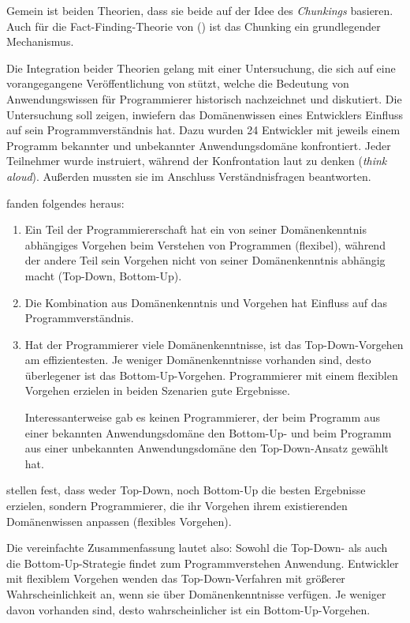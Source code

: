\begin{important}
Gemein ist beiden Theorien, dass sie beide auf der Idee des \textit{Chunkings} \citep{Miller:1956dz} basieren. Auch für die Fact-Finding-Theorie von \cite{LaToza:2007fj} () ist das Chunking ein grundlegender Mechanismus.

Die Integration beider Theorien gelang \cite{Shaft:1998tc} mit einer Untersuchung, die sich auf eine vorangegangene Veröffentlichung von \cite{Glass:1992cw} stützt, welche die Bedeutung von Anwendungswissen für Programmierer historisch nachzeichnet und diskutiert. Die Untersuchung soll zeigen, inwiefern das Domänenwissen eines Entwicklers Einfluss auf sein Programmverständnis hat. Dazu wurden 24 Entwickler mit jeweils einem Programm bekannter und unbekannter Anwendungsdomäne konfrontiert. Jeder Teilnehmer wurde instruiert, während der Konfrontation laut zu denken (\textit{think aloud}). Außerden mussten sie im Anschluss Verständnisfragen beantworten.

\cite{Shaft:1998tc} fanden folgendes heraus:
\begin{enumerate}
\item Ein Teil der Programmiererschaft hat ein von seiner Domänenkenntnis abhängiges Vorgehen beim Verstehen von Programmen (flexibel), während der andere Teil sein Vorgehen nicht von seiner Domänenkenntnis abhängig macht (Top-Down, Bottom-Up).
\item Die Kombination aus Domänenkenntnis und Vorgehen hat Einfluss auf das Programmverständnis.
\item Hat der Programmierer viele Domänenkenntnisse, ist das Top-Down-Vorgehen am effizientesten. Je weniger Domänenkenntnisse vorhanden sind, desto überlegener ist das Bottom-Up-Vorgehen. Programmierer mit einem flexiblen Vorgehen erzielen in beiden Szenarien gute Ergebnisse.

Interessanterweise gab es keinen Programmierer, der beim Programm aus einer bekannten Anwendungsdomäne den Bottom-Up- und beim Programm aus einer unbekannten Anwendungsdomäne den Top-Down-Ansatz gewählt hat.
\end{enumerate}

\cite{Shaft:1998tc} stellen fest, dass weder Top-Down, noch Bottom-Up die besten Ergebnisse erzielen, sondern Programmierer, die ihr Vorgehen ihrem existierenden Domänenwissen anpassen (flexibles Vorgehen).

Die vereinfachte Zusammenfassung lautet also: Sowohl die Top-Down- als auch die Bottom-Up-Strategie findet zum Programmverstehen Anwendung. Entwickler mit flexiblem Vorgehen wenden das Top-Down-Verfahren mit größerer Wahrscheinlichkeit an, wenn sie über Domänenkenntnisse verfügen. Je weniger davon vorhanden sind, desto wahrscheinlicher ist ein Bottom-Up-Vorgehen.  
\end{important}

